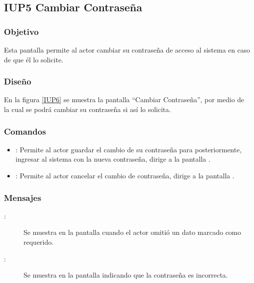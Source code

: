 \subsection{IUP5 Cambiar Contraseña}
 
\subsubsection{Objetivo}

    Esta pantalla permite al actor cambiar su contraseña de acceso al sistema en caso de que él lo solicite.

\subsubsection{Diseño}

    En la figura \ref{IUP6} se muestra la pantalla ``Cambiar Contraseña'', por medio de la cual se podrá cambiar su contraseña si así lo solicita. \\


\subsubsection{Comandos}
\begin{itemize}
    \item {}: Permite al actor guardar el cambio de su contraseña para posteriormente, ingresar al sistema con la nueva contraseña, dirige a la pantalla .
    \item {}: Permite al actor cancelar el cambio de contraseña, dirige a la pantalla .
\end{itemize}

\subsubsection{Mensajes}

\begin{description}
    \item[:] Se muestra en la pantalla  cuando el actor omitió un dato marcado como requerido.
    \item[:] Se muestra en la pantalla  indicando que la contraseña es incorrecta.
\end{description}
